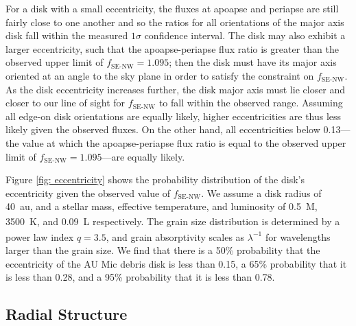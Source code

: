\documentclass[modern]{aastex62}
\begin{document}
For a disk with a small eccentricity, the fluxes at apoapse and periapse are still fairly close to one another and so the ratios for all orientations of the major axis disk fall within the measured $1\sigma$ confidence interval. 
The disk may also exhibit a larger eccentricity, such that the apoapse-periapse flux ratio is greater than the observed upper limit of $f_{\text{SE-NW}}=1.095$; then the disk must have its major axis oriented at an angle to the sky plane in order to satisfy the constraint on $f_{\text{SE-NW}}$. 
As the disk eccentricity increases further, the disk major axis must lie closer and closer to our line of sight for $f_{\text{SE-NW}}$ to fall within the observed range.
Assuming all edge-on disk orientations are equally likely, higher eccentricities are thus less likely given the observed fluxes. 
On the other hand, all eccentricities below 0.13---the value at which the apoapse-periapse flux ratio is equal to the observed upper limit of $f_{\text{SE-NW}}=1.095$---are equally likely. 

Figure \ref{fig: eccentricity} shows the probability distribution of the disk's eccentricity given the observed value of $f_{\text{SE-NW}}$.
We assume a disk radius of \SI{40}{au}, and a stellar mass, effective temperature, and luminosity of \SI{0.5}{M_\sun}, \SI{3500}{K}, and \SI{0.09}{L_\sun} respectively. 
The grain size distribution is determined by a power law index $q=3.5$, and grain absorptivity scales as $\lambda^{-1}$ for wavelengths larger than the grain size.
We find that there is a 50\% probability that the eccentricity of the AU Mic debris disk is less than 0.15, a 65\% probability that it is less than 0.28, and a 95\% probability that it is less than 0.78.


\subsection{Radial Structure}
\label{subsection: radial discussion}
\end{document}
